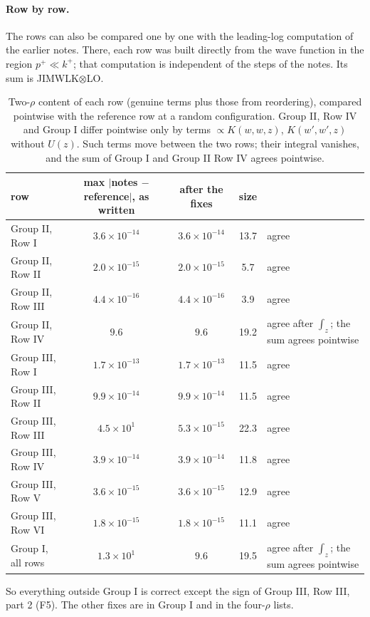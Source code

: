 \documentclass[10pt]{article}
\numberwithin{equation}{section}
\begin{document}
\paragraph{Row by row.} The rows can also be compared one by one with the leading-log computation of the earlier notes. There, each row was built directly from the wave function in the region $p^+\ll k^+$; that computation is independent of the steps of the notes. Its sum is JIMWLK$\otimes$LO.
\begin{table}[h]
\centering\small
\begin{tabular}{@{}l c c c l@{}}
row & max $|$notes $-$ reference$|$, as written & after the fixes & size & \\ \hline
Group II, Row I & $3.6\times10^{-14}$ & $3.6\times10^{-14}$ & 13.7 & agree\\
Group II, Row II & $2.0\times10^{-15}$ & $2.0\times10^{-15}$ & 5.7 & agree\\
Group II, Row III & $4.4\times10^{-16}$ & $4.4\times10^{-16}$ & 3.9 & agree\\
Group II, Row IV & $9.6$ & $9.6$ & 19.2 & agree after $\int_z$; the sum agrees pointwise\\
Group III, Row I & $1.7\times10^{-13}$ & $1.7\times10^{-13}$ & 11.5 & agree\\
Group III, Row II & $9.9\times10^{-14}$ & $9.9\times10^{-14}$ & 11.5 & agree\\
Group III, Row III & $4.5\times10^{1}$ & $5.3\times10^{-15}$ & 22.3 & agree\\
Group III, Row IV & $3.9\times10^{-14}$ & $3.9\times10^{-14}$ & 11.8 & agree\\
Group III, Row V & $3.6\times10^{-15}$ & $3.6\times10^{-15}$ & 12.9 & agree\\
Group III, Row VI & $1.8\times10^{-15}$ & $1.8\times10^{-15}$ & 11.1 & agree\\
Group I, all rows & $1.3\times10^{1}$ & $9.6$ & 19.5 & agree after $\int_z$; the sum agrees pointwise\\
\end{tabular}
\caption{Two-$\rho$ content of each row (genuine terms plus those from reordering), compared pointwise with the reference row at a random configuration. Group II, Row IV and Group I differ pointwise only by terms $\propto K(w,w,z)$, $K(w',w',z)$ without $U(z)$. Such terms move between the two rows; their integral vanishes, and the sum of Group I and Group II Row IV agrees pointwise.}
\label{T:tab:rows}
\end{table}
So everything outside Group I is correct except the sign of Group III, Row III, part 2 (F5). The other fixes are in Group I and in the four-$\rho$ lists.
\end{document}
